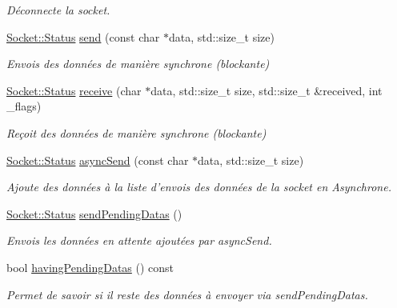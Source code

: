 \begin{DoxyCompactItemize}
\begin{DoxyCompactList}\small\item\em Déconnecte la socket. \end{DoxyCompactList}\item 
\hyperlink{classmognetwork_1_1_socket_aa187a8394ac0d6203af0ec7f021ca15f}{Socket\-::\-Status} \hyperlink{classmognetwork_1_1_tcp_socket_a6cd80d53f05a4d91ed1a66e17e9a3d54}{send} (const char $\ast$data, std\-::size\-\_\-t size)
\begin{DoxyCompactList}\small\item\em Envois des données de manière synchrone (blockante) \end{DoxyCompactList}\item 
\hyperlink{classmognetwork_1_1_socket_aa187a8394ac0d6203af0ec7f021ca15f}{Socket\-::\-Status} \hyperlink{classmognetwork_1_1_tcp_socket_a44fd93d5f7bcf3d155a93e4db6d5f2e9}{receive} (char $\ast$data, std\-::size\-\_\-t size, std\-::size\-\_\-t \&received, int \-\_\-flags)
\begin{DoxyCompactList}\small\item\em Reçoit des données de manière synchrone (blockante) \end{DoxyCompactList}\item 
\hyperlink{classmognetwork_1_1_socket_aa187a8394ac0d6203af0ec7f021ca15f}{Socket\-::\-Status} \hyperlink{classmognetwork_1_1_tcp_socket_ae136e74283e5e8d0704c52d8110f1896}{async\-Send} (const char $\ast$data, std\-::size\-\_\-t size)
\begin{DoxyCompactList}\small\item\em Ajoute des données à la liste d'envois des données de la socket en Asynchrone. \end{DoxyCompactList}\item 
\hyperlink{classmognetwork_1_1_socket_aa187a8394ac0d6203af0ec7f021ca15f}{Socket\-::\-Status} \hyperlink{classmognetwork_1_1_tcp_socket_afbb854293f7f8e404bb553e5c5ba1277}{send\-Pending\-Datas} ()
\begin{DoxyCompactList}\small\item\em Envois les données en attente ajoutées par async\-Send. \end{DoxyCompactList}\item 
bool \hyperlink{classmognetwork_1_1_tcp_socket_aff17b683f622b017876751d9cbbad3bb}{having\-Pending\-Datas} () const 
\begin{DoxyCompactList}\small\item\em Permet de savoir si il reste des données à envoyer via send\-Pending\-Datas. \end{DoxyCompactList}\item 

\end{DoxyCompactItemize}
